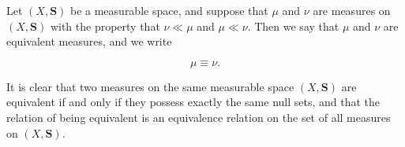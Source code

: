 Let $(X, \mathbf{S})$ be a measurable space, and suppose that $\mu$ and $\nu$ are measures on $(X, \mathbf{S})$ with the property that $\nu \ll \mu$ and $\mu \ll \nu$. Then we say that $\mu$ and $\nu$ are equivalent measures, and we write

$$\mu \equiv \nu.$$

It is clear that two measures on the same measurable space $(X, \mathbf{S})$ are equivalent if and only if they possess exactly the same null sets, and that the relation of being equivalent is an equivalence relation on the set of all measures on $(X, \mathbf{S})$.
